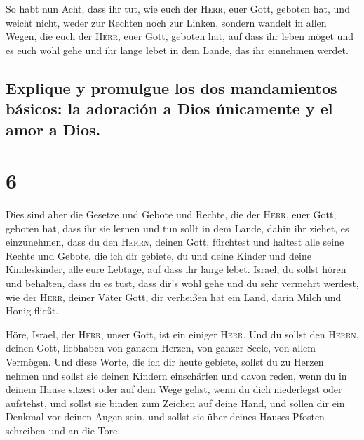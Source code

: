  So habt nun Acht, dass ihr tut, wie euch der
\textsc{Herr}, euer Gott, geboten hat, und weicht nicht, weder zur
Rechten noch zur Linken,  sondern wandelt in allen Wegen,
die euch der \textsc{Herr}, euer Gott, geboten hat, auf dass ihr leben
möget und es euch wohl gehe und ihr lange lebet in dem Lande, das ihr
einnehmen werdet.

\hypertarget{explique-y-promulgue-los-dos-mandamientos-buxe1sicos-la-adoraciuxf3n-a-dios-uxfanicamente-y-el-amor-a-dios.}{%
\subsection{Explique y promulgue los dos mandamientos básicos: la
adoración a Dios únicamente y el amor a
Dios.}\label{explique-y-promulgue-los-dos-mandamientos-buxe1sicos-la-adoraciuxf3n-a-dios-uxfanicamente-y-el-amor-a-dios.}}

\hypertarget{section-5}{%
\section{6}\label{section-5}}

 Dies sind aber die Gesetze und Gebote und Rechte, die der
\textsc{Herr}, euer Gott, geboten hat, dass ihr sie lernen und tun sollt
in dem Lande, dahin ihr ziehet, es einzunehmen,  dass du
den \textsc{Herrn}, deinen Gott, fürchtest und haltest alle seine Rechte
und Gebote, die ich dir gebiete, du und deine Kinder und deine
Kindeskinder, alle eure Lebtage, auf dass ihr lange lebet.
 Israel, du sollst hören und behalten, dass du es tust,
dass dir's wohl gehe und du sehr vermehrt werdest, wie der
\textsc{Herr}, deiner Väter Gott, dir verheißen hat ein Land, darin
Milch und Honig fließt.

 Höre, Israel, der \textsc{Herr}, unser Gott, ist ein
einiger \textsc{Herr}.  Und du sollst den \textsc{Herrn},
deinen Gott, liebhaben von ganzem Herzen, von ganzer Seele, von allem
Vermögen.  Und diese Worte, die ich dir heute gebiete,
sollst du zu Herzen nehmen  und sollst sie deinen Kindern
einschärfen und davon reden, wenn du in deinem Hause sitzest oder auf
dem Wege gehst, wenn du dich niederlegst oder aufstehst, 
und sollst sie binden zum Zeichen auf deine Hand, und sollen dir ein
Denkmal vor deinen Augen sein,  und sollst sie über deines
Hauses Pfosten schreiben und an die Tore.


